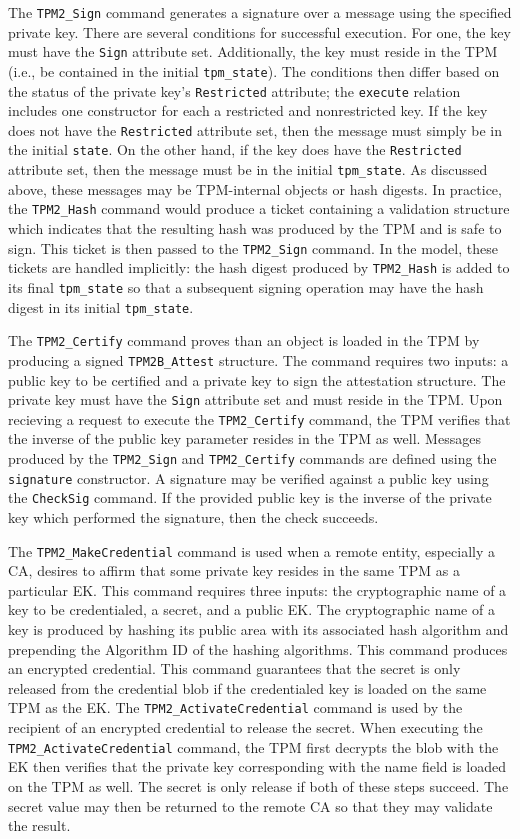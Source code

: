 The \verb|TPM2_Sign| command generates a signature over a message using the specified private key. There are several conditions for successful execution. For one, the key must have the \verb|Sign| attribute set. Additionally, the key must reside in the TPM (i.e., be contained in the initial \verb|tpm_state|). The conditions then differ based on the status of the private key's \verb|Restricted| attribute; the \verb|execute| relation includes one constructor for each a restricted and nonrestricted key. If the key does not have the \verb|Restricted| attribute set, then the message must simply be in the initial \verb|state|. On the other hand, if the key does have the \verb|Restricted| attribute set, then the message must be in the initial \verb|tpm_state|. As discussed above, these messages may be TPM-internal objects or hash digests. In practice, the \verb|TPM2_Hash| command would produce a ticket containing a validation structure which indicates that the resulting hash was produced by the TPM and is safe to sign. This ticket is then passed to the \verb|TPM2_Sign| command. In the model, these tickets are handled implicitly: the hash digest produced by \verb|TPM2_Hash| is added to its final \verb|tpm_state| so that a subsequent signing operation may have the hash digest in its initial \verb|tpm_state|. 

The \verb|TPM2_Certify| command proves than an object is loaded in the TPM by producing a signed \verb|TPM2B_Attest| structure. The command requires two inputs: a public key to be certified and a private key to sign the attestation structure. The private key must have the \verb|Sign| attribute set and must reside in the TPM. Upon recieving a request to execute the \verb|TPM2_Certify| command, the TPM verifies that the inverse of the public key parameter resides in the TPM as well. Messages produced by the \verb|TPM2_Sign| and \verb|TPM2_Certify| commands are defined using the \verb|signature| constructor. A signature may be verified against a public key using the \verb|CheckSig| command. If the provided public key is the inverse of the private key which performed the signature, then the check succeeds.


The \verb|TPM2_MakeCredential| command is used when a remote entity, especially a CA, desires to affirm that some private key resides in the same TPM as a particular EK. This command requires three inputs: the cryptographic name of a key to be credentialed, a secret, and a public EK. The cryptographic name of a key is produced by hashing its public area with its associated hash algorithm and prepending the Algorithm ID of the hashing algorithms. This command produces an encrypted credential. This command guarantees that the secret is only released from the credential blob if the credentialed key is loaded on the same TPM as the EK.
The \verb|TPM2_ActivateCredential| command is used by the recipient of an encrypted credential to release the secret. When executing the \verb|TPM2_ActivateCredential| command, the TPM first decrypts the blob with the EK then verifies that the private key corresponding with the name field is loaded on the TPM as well. The secret is only release if both of these steps succeed. The secret value may then be returned to the remote CA so that they may validate the result.



